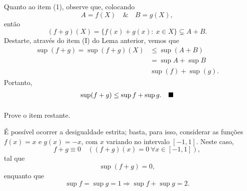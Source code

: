 \documentclass[../analysisII_notes.tex]{subfiles}
\begin{document}
\begin{proof*}
	Quanto ao item (1), observe que, colocando
	\[
		A=f(X)\quad\&\quad B=g(X),
	\]
	então
	\[
		(f+g)(X)=\{f(x)+g(x):\:x\in X\}\subsetneq A+B.
	\]
	Destarte, através do item (I) do Lema anterior, vemos que
	\begin{align*}
		\sup_{}(f+g)=\sup_{}(f+g)(X) & \leq \sup_{}(A+B)      \\
		                             & =\sup_{}A+\sup_{}B     \\
		                             & \sup_{}(f)+\sup_{}(g).
	\end{align*}
	Portanto,
	\[
		\sup_{}(f+g)\leq \sup_{}f +\sup_{}g.\quad \text{$\blacksquare$}
	\]
\end{proof*}
\begin{exr}
	Prove o item restante.
\end{exr}

\begin{example}
	É possível ocorrer a desigualdade estrita; basta, para isso, considerar as funções \(f(x)=x\) e \(g(x)=-x\), com \(x\) variando no intervalo \([-1, 1]\). Neste caso,
	\[
		f+g\equiv 0 \quad ((f+g)(x)=0\: \forall x\in [-1, 1]),
	\]
	tal que
	\[
		\sup_{}(f+g)= 0,
	\]
	enquanto que
	\[
		\sup_{}f = \sup_{}g = 1 \Rightarrow \sup_{}f + \sup_{}g = 2.
	\]
\end{example}
\end{document}
